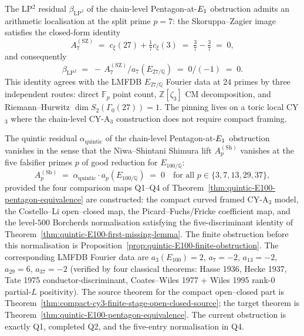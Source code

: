 \begin{proposition}
\label{prop:class-B-falsifier-arithmetic-lp2}
The LP$^{2}$ residual $\beta_{\mathrm{LP}^2}$ of the chain-level
Pentagon-at-$E_{1}$ obstruction admits an arithmetic localisation at
the split prime $p = 7$: the Skoruppa--Zagier image satisfies the
closed-form identity
\[
 A_7^{(\mathrm{SZ})} \;=\; c_\xi(27) + \tfrac{1}{7} c_\xi(3) \;=\; \tfrac{3}{7} - \tfrac{3}{7} \;=\; 0,
\]
and consequently
\[
 \beta_{\mathrm{LP}^2} \;=\; -\, A_7^{(\mathrm{SZ})} / a_7(E_{27/\mathbb{Q}}) \;=\; 0 / (-1) \;=\; 0.
\]
This identity agrees with the LMFDB
\(E_{27/\mathbb Q}\) Fourier data at \(24\) primes by three
independent routes: direct
$\mathbb{F}_p$ point count, $\mathbb{Z}[\zeta_3]$ CM decomposition,
and Riemann--Hurwitz \(\dim S_2(\Gamma_0(27))=1\). The pinning
lives on a toric local CY$_3$ where the chain-level CY-A$_3$
construction does not require compact framing.
\end{proposition}

\begin{theorem}
\label{conj:class-B-falsifier-arithmetic-quintic}
The quintic residual $\alpha_{\mathrm{quintic}}$ of the chain-level
Pentagon-at-$E_{1}$ obstruction vanishes in the sense that the
Niwa--Shintani Shimura lift $A_p^{(\mathrm{Sh})}$ vanishes at the five
falsifier primes
$p$ of good reduction for $E_{100/\mathbb{Q}}$:
\[
 A_p^{(\mathrm{Sh})} \;=\; \alpha_{\mathrm{quintic}} \cdot a_p(E_{100/\mathbb{Q}}) \;=\; 0 \quad \text{for all } p \in \{3, 7, 13, 29, 37\},
\]
provided the four comparison maps \textup{Q1}--\textup{Q4} of
Theorem~\ref{thm:quintic-E100-pentagon-equivalence} are constructed:
the compact curved framed CY-A$_3$ model, the Costello--Li open--closed
map, the Picard--Fuchs/Fricke coefficient map, and the level-$500$
Borcherds normalisation satisfying the five-discriminant identity of
Theorem~\ref{thm:quintic-E100-first-missing-lemma}. The finite
obstruction before this normalisation is
Proposition~\ref{prop:quintic-E100-finite-obstruction}. The
corresponding LMFDB Fourier data are
$a_3(E_{100}) = 2$,
$a_7 = -2$, $a_{13} = -2$, $a_{29} = 6$, $a_{37} = -2$ \textup{(}verified
by four classical theorems: Hasse 1936, Hecke 1937, Tate 1975
conductor-discriminant, Coates--Wiles 1977 + Wiles 1995 rank-$0$
partial-$L$ positivity\textup{).} The source theorem for the compact
open--closed part is
Theorem~\ref{thm:compact-cy3-finite-stage-open-closed-source}; the
target theorem is Theorem~\ref{thm:quintic-E100-pentagon-equivalence}.
The current obstruction is exactly \textup{Q1}, completed \textup{Q2},
and the five-entry normalisation in \textup{Q4}.
\end{theorem}

